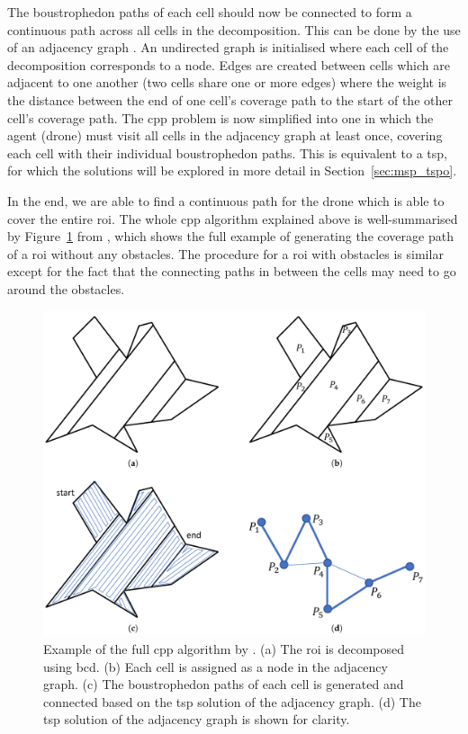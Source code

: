 The boustrophedon paths of each cell should now be connected to form a continuous path across all cells in the decomposition. This can be done by the use of an adjacency graph \cite{choset1998bcd}. An undirected graph is initialised where each cell of the decomposition corresponds to a node. Edges are created between cells which are adjacent to one another (two cells share one or more edges) where the weight is the distance between the end of one cell's coverage path to the start of the other cell's coverage path. The \gls{cpp} problem is now simplified into one in which the agent (drone) must visit all cells in the adjacency graph at least once, covering each cell with their individual boustrophedon paths. This is equivalent to a \gls{tsp}, for which the solutions will be explored in more detail in Section~\ref{sec:msp_tspo}. 

In the end, we are able to find a continuous path for the drone which is able to cover the entire \gls{roi}. The whole \gls{cpp} algorithm explained above is well-summarised by Figure~\ref{fig:msp_cabreira} from \cite{cabreira2019surveycpp}, which shows the full example of generating the coverage path of a \gls{roi} without any obstacles. The procedure for a \gls{roi} with obstacles is similar except for the fact that the connecting paths in between the cells may need to go around the obstacles.  

\begin{figure}[h!]
    \centering
    \includegraphics[width=0.7\linewidth]{figs//Jihwan/cabreira.png}
    \caption[Example of the Full CPP Algorithm]{Example of the full \gls{cpp} algorithm by \cite{cabreira2019surveycpp}. (a) The \gls{roi} is decomposed using \gls{bcd}. (b) Each cell is assigned as a node in the adjacency graph. (c) The boustrophedon paths of each cell is generated and connected based on the \gls{tsp} solution of the adjacency graph. (d) The \gls{tsp} solution of the adjacency graph is shown for clarity.}
    \label{fig:msp_cabreira}
\end{figure}

